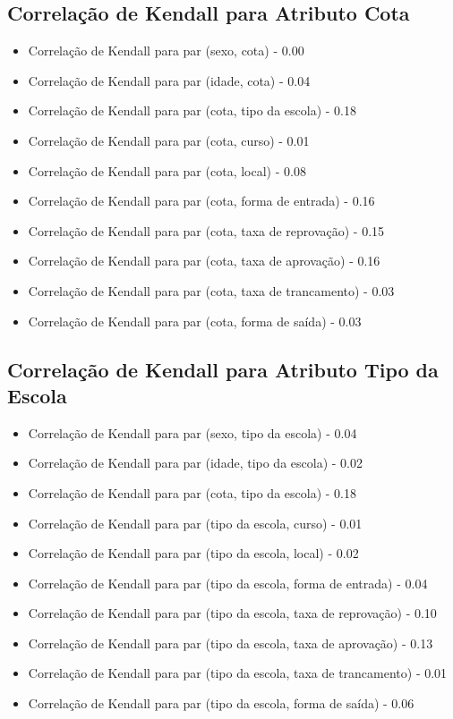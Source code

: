 \subsection{Correlação de Kendall para Atributo Cota}
\begin{itemize}
    \item Correlação de Kendall para par (sexo, cota) - 0.00
    \item Correlação de Kendall para par (idade, cota) - 0.04
    \item Correlação de Kendall para par (cota, tipo da escola) - 0.18
    \item Correlação de Kendall para par (cota, curso) - 0.01
    \item Correlação de Kendall para par (cota, local) - 0.08
    \item Correlação de Kendall para par (cota, forma de entrada) - 0.16
    \item Correlação de Kendall para par (cota, taxa de reprovação) - 0.15
    \item Correlação de Kendall para par (cota, taxa de aprovação) - 0.16
    \item Correlação de Kendall para par (cota, taxa de trancamento) - 0.03
    \item Correlação de Kendall para par (cota, forma de saída) - 0.03
\end{itemize}

\subsection{Correlação de Kendall para Atributo Tipo da Escola}
\begin{itemize}
    \item Correlação de Kendall para par (sexo, tipo da escola) - 0.04
    \item Correlação de Kendall para par (idade, tipo da escola) - 0.02
    \item Correlação de Kendall para par (cota, tipo da escola) - 0.18
    \item Correlação de Kendall para par (tipo da escola, curso) - 0.01
    \item Correlação de Kendall para par (tipo da escola, local) - 0.02
    \item Correlação de Kendall para par (tipo da escola, forma de entrada) - 0.04
    \item Correlação de Kendall para par (tipo da escola, taxa de reprovação) - 0.10
    \item Correlação de Kendall para par (tipo da escola, taxa de aprovação) - 0.13
    \item Correlação de Kendall para par (tipo da escola, taxa de trancamento) - 0.01
    \item Correlação de Kendall para par (tipo da escola, forma de saída) - 0.06
\end{itemize}

